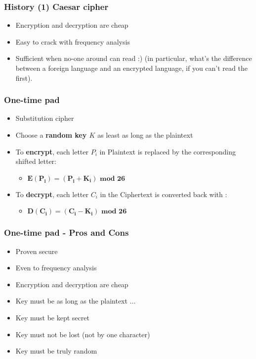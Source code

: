 \documentclass[
hyperref={pdfpagelabels=false}
,xcolor=table
]
{beamer}
\newcommand{\plus}{{\texttt{[image: plus.png]}}}
\newcommand{\minus}{{\texttt{[image: minus.png]}}}
\begin{document}
\begin{frame}
  \frametitle{History (1) Caesar cipher}
 
  \begin{itemize}
  \item[\plus] Encryption and decryption are cheap
  \item[\minus] Easy to crack with frequency analysis
  \item[\minus] Sufficient when no-one around can read :) (in
    particular, what's the difference between a foreign language and
    an encrypted language, if you can't read the first).
  \end{itemize}
\end{frame}


\begin{frame}
  \frametitle{One-time pad}
  \begin{itemize}
  \item Substitution cipher
  \item Choose a \textbf{random key $K$} as least as long as the plaintext
  \item To \textbf{encrypt}, each letter $P_i$ in Plaintext is replaced by the corresponding shifted letter:
    \begin{itemize}
    \item[] $\bm{E(P_i) = (P_i + K_i) \mbox{ mod } 26}$
    \end{itemize}
  \item To \textbf{decrypt}, each letter $C_i$ in the Ciphertext is converted back with :
    \begin{itemize}
    \item[] $\bm{D(C_i) = (C_i - K_i) \mbox{ mod } 26}$ 
    \end{itemize} 
  \end{itemize}
  
\end{frame}


\begin{frame}
  \frametitle{One-time pad - Pros and Cons}

  \begin{itemize}
  \item[\plus] Proven secure
  \item[\plus] Even to frequency analysis
  \item[\plus] Encryption and decryption are cheap
  \item[\minus] Key must be as long as the plaintext ... 
  \item[\minus] Key must be kept secret
  \item[\minus] Key must not be lost (not by one character)  
  \item[\minus] Key must be truly random 
  \end{itemize}
\end{frame}
\end{document}
